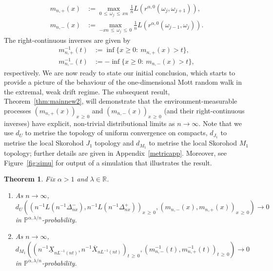 \documentclass[10pt]{amsart}
\newtheorem{theo}{Theorem}[section]
\theoremstyle{definition}\newtheorem{defi}[theo]{Definition}\newtheorem{rema}[theo]{Remark}\newtheorem{exam}[theo]{Example}\newtheorem{exem}[theo]{Example}\newtheorem{nota}[theo]{Notation}
\newcommand{\R}{\mathbb R}
\renewcommand{\P}{\mathbb P}
\newcommand*{\alphenumi}{\renewcommand*{\theenumi}{\alph{enumi}}}
\begin{document}
\begin{align}
m_{n,+}(x)&:=\max_{0\,\le\,\omega_j\,\le\,xn} \frac{1}{n}L\left(r^{\alpha,0}\left(\omega_j,\omega_{j+1}\right)\right),\label{mnp}
\\
m_{n,-}(x)&:=\max_{-xn\,\leq\,\omega_j\,\le\,0} \frac{1}{n}L\left(r^{\alpha,0}\left(\omega_{j-1},\omega_{j}\right)\right).\label{mnn}
\end{align}
The right-continuous inverses are given by
\begin{align}
m^{-1}_{n,+}(t)&:=\inf\{x\geq 0:\:m_{n,+}(x)>t\},\label{mnpinv}
\\
m^{-1}_{n,-}(t)&:=-\inf\{x\geq 0:\:m_{n,-}(x)>t\},\label{mnninv}
\end{align}
respectively. We are now ready to state our initial conclusion, which starts to provide a picture of the behaviour of the one-dimensional Mott random walk in the extremal, weak drift regime. The subsequent result, Theorem~\ref{thm:mainnew2}, will demonstrate that the environment-measurable processes $(m_{n,+}(x))_{x\,\geq\,0}$ and $(m_{n,-}(x))_{x\,\geq\,0}$ (and their right-continuous inverses) have explicit, non-trivial distributional limits as $n\rightarrow\infty$. Note that we use $d_U$ to metrise the topology of uniform convergence on compacts, $d_{J_1}$ to metrise the local Skorohod $J_1$ topology and $d_{M_1}$ to metrise the local Skorohod $M_1$ topology; further details are given in Appendix~\ref{metricapp}. Moreover, see Figure~\ref{fig:simu} for output of a simulation that illustrates the result.

\begin{theo}\label{thm:mainnew1}
Fix $\alpha>1$ and $\lambda\in\R$.
\begin{enumerate}\alphenumi
\item\label{theo1.1.a} As $n\rightarrow\infty$,
\[
d_{U}\left(\left(n^{-1}L\left(n^{-1}\Delta^-_{nx}\right),n^{-1}L\left(n^{-1}\Delta^+_{nx}\right)\right)_{x\,\geq\,0},\left(m_{n,-}(x),m_{n,+}(x)\right)_{x\,\geq\,0}\right)\rightarrow 0
\]
in $\P^{\alpha,\lambda/n}$-probability.
\item\label{theo1.1.b} As $n\rightarrow\infty$,
\[
d_{M_1}\left(\left(n^{-1}\underline{X}_{nL^{-1}(n t)},n^{-1}\overline{X}_{nL^{-1}(n t)}\right)_{t\,\geq\,0},\left(m_{n,-}^{-1}(t),m_{n,+}^{-1}(t)\right)_{t\,\geq\,0}\right)\rightarrow 0
\]
in $\P^{\alpha,\lambda/n}$-probability.
\end{enumerate}
\end{theo}
\end{document}
